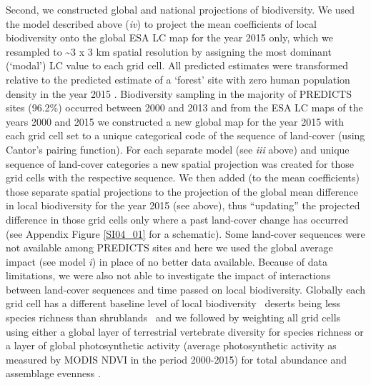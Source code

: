Second, we constructed global and national projections of biodiversity. We used the model described above (\textit{iv}) to project the mean coefficients of local biodiversity onto the global ESA LC map for the year 2015 only, which we resampled to \textasciitilde3 x 3 km spatial resolution by assigning the most dominant (‘modal’) LC value to each grid cell. All predicted estimates were transformed relative to the predicted estimate of a ‘forest’ site with zero human population density in the year 2015 \citep{Newbold2015}. Biodiversity sampling in the majority of PREDICTS sites (96.2\%) occurred between 2000 and 2013 and from the ESA LC maps of the years 2000 and 2015 we constructed a new global map for the year 2015 with each grid cell set to a unique categorical code of the sequence of land-cover (using Cantor’s pairing function). For each separate model (see \textit{iii} above) and unique sequence of land-cover categories a new spatial projection was created for those grid cells with the respective sequence. We then added (to the mean coefficients) those separate spatial projections to the projection of the global mean difference in local biodiversity for the year 2015 (see above), thus “updating” the projected difference in those grid cells only where a past land-cover change has occurred (see Appendix Figure \ref{SI04_01} for a schematic). Some land-cover sequences were not available among PREDICTS sites and here we used the global average impact (see model \textit{i}) in place of no better data available. Because of data limitations, we were also not able to investigate the impact of interactions between land-cover sequences and time passed on local biodiversity. Globally each grid cell has a different baseline level of local biodiversity \textendash\ \eg deserts being less species richness than shrublands \textendash\ and we followed \cite{Newbold2015} by weighting all grid cells using either a global layer of terrestrial vertebrate diversity \citep[summed range-of-occurrence maps for bird, mammal and amphibian species,][]{NatureServe2012,IUCN2016a} for species richness or a layer of global photosynthetic activity (average photosynthetic activity as measured by MODIS NDVI in the period 2000-2015) for total abundance and assemblage evenness \citep{Newbold2015}. 

